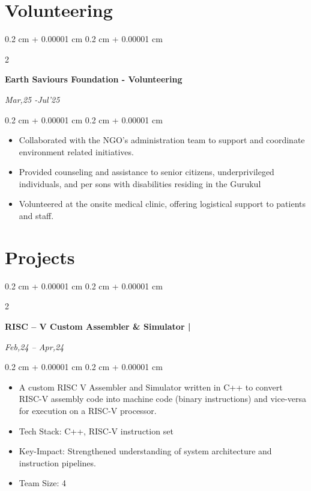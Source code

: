 \documentclass[10pt, letterpaper]{article}
\newenvironment{highlights}{
    \begin{itemize}[
        topsep=0.10 cm,
        parsep=0.10 cm,
        partopsep=0pt,
        itemsep=0pt,
        leftmargin=0.4 cm + 10pt
    ]
}{
    \end{itemize}
} %
\newenvironment{onecolentry}{
    \begin{adjustwidth}{
        0.2 cm + 0.00001 cm
    }{
        0.2 cm + 0.00001 cm
    }
}{
    \end{adjustwidth}
} %
\newenvironment{twocolentry}[2][]{
    \onecolentry
    \def\secondColumn{#2}
    \setcolumnwidth{\fill, 4.5 cm}
    \begin{paracol}{2}
}{
    \switchcolumn \raggedleft \secondColumn
    \end{paracol}
    \endonecolentry
} %
\let\hrefWithoutArrow\href
\renewcommand{\href}[2]{\hrefWithoutArrow{#1}{\ifthenelse{\equal{#2}{}}{ }{#2 }\raisebox{.15ex}{\footnotesize \faExternalLink*}}}
\begin{document}
    \section{Volunteering}

        \begin{twocolentry}{
            
            \textit{Mar,25 -Jul'25}}
            \textbf{ Earth Saviours Foundation - Volunteering}
        \end{twocolentry}
        
        \vspace{0.10 cm}
        \begin{onecolentry}
            \begin{highlights}
                \item Collaborated with the NGO’s administration team to support and coordinate environment
related initiatives.
                \item Provided counseling and assistance to senior citizens, underprivileged individuals, and per
sons with disabilities residing in the Gurukul
                \item Volunteered at the onsite medical clinic, offering logistical support to patients and staff.
            \end{highlights}
        \end{onecolentry}


    \section{Projects}

        \begin{twocolentry}{
            
            
        \textit{Feb,24 – Apr,24}}
            \textbf{RISC – V Custom Assembler \& Simulator | \href{https://github.com/SakshamMishra2023/RISC_V_Assembler-Simulator.git}{github repo}}
        \end{twocolentry}

        \vspace{0.10 cm}
        \begin{onecolentry}
            \begin{highlights}
                \item A custom RISC V Assembler and Simulator written in C++ to convert RISC-V assembly code
into machine code (binary instructions) and vice-versa for execution on a RISC-V processor.
                \item Tech Stack: C++, RISC-V instruction set 
                \item Key-Impact: Strengthened understanding of system architecture and instruction pipelines.
                \item Team Size: 4
                \end{highlights} \end{onecolentry}
\end{document}
